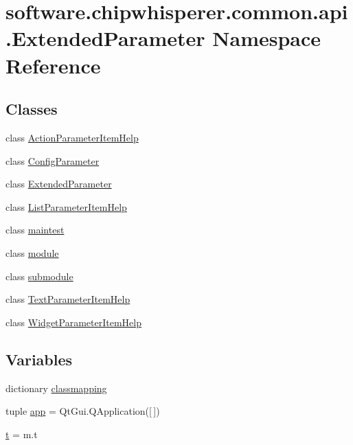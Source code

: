 \hypertarget{namespacesoftware_1_1chipwhisperer_1_1common_1_1api_1_1ExtendedParameter}{}\section{software.\+chipwhisperer.\+common.\+api.\+Extended\+Parameter Namespace Reference}
\label{namespacesoftware_1_1chipwhisperer_1_1common_1_1api_1_1ExtendedParameter}
\subsection*{Classes}
\begin{DoxyCompactItemize}
\item 
class \hyperlink{classsoftware_1_1chipwhisperer_1_1common_1_1api_1_1ExtendedParameter_1_1ActionParameterItemHelp}{Action\+Parameter\+Item\+Help}
\item 
class \hyperlink{classsoftware_1_1chipwhisperer_1_1common_1_1api_1_1ExtendedParameter_1_1ConfigParameter}{Config\+Parameter}
\item 
class \hyperlink{classsoftware_1_1chipwhisperer_1_1common_1_1api_1_1ExtendedParameter_1_1ExtendedParameter}{Extended\+Parameter}
\item 
class \hyperlink{classsoftware_1_1chipwhisperer_1_1common_1_1api_1_1ExtendedParameter_1_1ListParameterItemHelp}{List\+Parameter\+Item\+Help}
\item 
class \hyperlink{classsoftware_1_1chipwhisperer_1_1common_1_1api_1_1ExtendedParameter_1_1maintest}{maintest}
\item 
class \hyperlink{classsoftware_1_1chipwhisperer_1_1common_1_1api_1_1ExtendedParameter_1_1module}{module}
\item 
class \hyperlink{classsoftware_1_1chipwhisperer_1_1common_1_1api_1_1ExtendedParameter_1_1submodule}{submodule}
\item 
class \hyperlink{classsoftware_1_1chipwhisperer_1_1common_1_1api_1_1ExtendedParameter_1_1TextParameterItemHelp}{Text\+Parameter\+Item\+Help}
\item 
class \hyperlink{classsoftware_1_1chipwhisperer_1_1common_1_1api_1_1ExtendedParameter_1_1WidgetParameterItemHelp}{Widget\+Parameter\+Item\+Help}
\end{DoxyCompactItemize}
\subsection*{Variables}
\begin{DoxyCompactItemize}
\item 
dictionary \hyperlink{namespacesoftware_1_1chipwhisperer_1_1common_1_1api_1_1ExtendedParameter_a5c71b47251831d072cda35010f85d807}{classmapping}
\item 
tuple \hyperlink{namespacesoftware_1_1chipwhisperer_1_1common_1_1api_1_1ExtendedParameter_a664d237b580080d9f0bd29bb2fcbc0de}{app} = Qt\+Gui.\+Q\+Application(\mbox{[}$\,$\mbox{]})
\item 
\hyperlink{namespacesoftware_1_1chipwhisperer_1_1common_1_1api_1_1ExtendedParameter_a2d7c51a90eae1d0bf747cbfeab9e553e}{t} = m.\+t
\end{DoxyCompactItemize}


